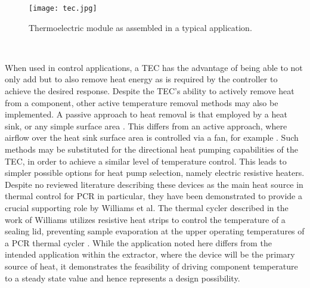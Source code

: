 \begin{figure}[!htb]
	\centering
	\texttt{[image: tec.jpg]}
	\caption[Thermoelectric Module Application.]{Thermoelectric module as assembled in a typical application. \cite{Ferrotec}}
	\label{fig:tec}
\end{figure} 
\FloatBarrier

When used in control applications, a TEC has the advantage of being able to not only add but to also remove heat energy as is required by the controller to achieve the desired response. Despite the TEC's ability to actively remove heat from a component, other active temperature removal methods may also be implemented. A passive approach to heat removal is that employed by a heat sink, or any simple surface area \cite{2006289990179}\cite{20144600208116}. This differs from an active approach, where airflow over the heat sink surface area is controlled via a fan, for example \cite{2006289990179}. Such methods may be substituted for the directional heat pumping capabilities of the TEC, in order to achieve a similar level of temperature control. This leads to simpler possible options for heat pump selection, namely electric resistive heaters. Despite no reviewed literature describing these devices as the main heat source in thermal control for PCR in particular, they have been demonstrated to provide a crucial supporting role by Williams et al. The thermal cycler described in the work of Williams utilizes resistive heat strips to control the temperature of a sealing lid, preventing sample evaporation at the upper operating temperatures of a PCR thermal cycler \cite{7238517}. While the application noted here differs from the intended application within the extractor, where the device will be the primary source of heat, it demonstrates the feasibility of driving component temperature to a steady state value and hence represents a design possibility.\\

